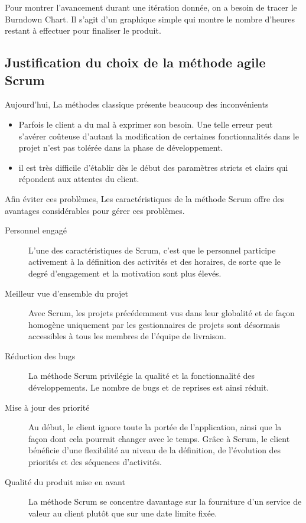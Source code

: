 Pour montrer l'avancement durant une itération donnée, on a besoin de tracer le
Burndown Chart. Il s'agit d'un graphique simple qui montre le nombre d'heures
restant à effectuer pour finaliser le produit.

\subsection{Justification du choix de la méthode agile Scrum}

Aujourd'hui, La méthodes classique présente beaucoup des inconvénients

\begin{itemize}
    \item Parfois le client a du mal à exprimer son besoin. Une telle erreur
        peut s'avérer coûteuse d'autant la modification de certaines
        fonctionnalités dans le projet n'est pas tolérée dans la phase de
        développement.
    \item il est très difficile d'établir dès le début des paramètres stricts
        et clairs qui répondent aux attentes du client.
\end{itemize}

Afin éviter ces problèmes, Les caractéristiques de la méthode Scrum offre des
avantages considérables pour gérer ces problèmes.

\begin{description}
    \item [Personnel engagé] L'une des caractéristiques de Scrum, c'est que le
        personnel participe activement à la définition des activités et des
        horaires, de sorte que le degré d'engagement et la motivation sont plus
        élevés.
    \item [Meilleur vue d'ensemble du projet] Avec Scrum, les projets
        précédemment vus dans leur globalité et de façon homogène uniquement
        par les gestionnaires de projets sont désormais accessibles à tous les
        membres de l'équipe de livraison.
    \item [Réduction des bugs] La méthode Scrum privilégie la qualité et la
        fonctionnalité des développements. Le nombre de bugs et de reprises est
        ainsi réduit.
    \item [Mise à jour des priorité] Au début, le client ignore toute la portée
        de l'application, ainsi que la façon dont cela pourrait changer avec le
        temps. Grâce à Scrum, le client bénéficie d'une flexibilité au niveau
        de la définition, de l'évolution des priorités et des séquences
        d'activités.
    \item [Qualité du produit mise en avant] La méthode Scrum se concentre
        davantage sur la fourniture d'un service de valeur au client plutôt que
        sur une date limite fixée.
\end{description}

